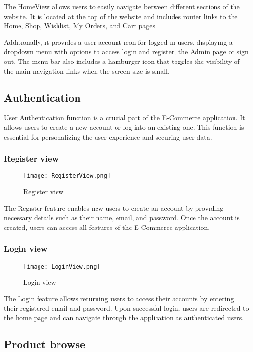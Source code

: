The HomeView allows users to easily navigate between different sections of the website. It is located at the top of the website and includes router links to the Home, Shop, Wishlist, My Orders, and Cart pages.

Additionally, it provides a user account icon for logged-in users, displaying a dropdown menu with options to access login and register, the Admin page or sign out. The menu bar also includes a hamburger icon that toggles the visibility of the main navigation links when the screen size is small.
\subsection{Authentication}
User Authentication function is a crucial part of the E-Commerce application. It allows users to create a new account or log into an existing one. This function is essential for personalizing the user experience and securing user data.

\subsubsection{Register view}
\begin{figure}[H]
    \texttt{[image: RegisterView.png]}
    \caption{Register view}
    \label{fig:RegisterView}
\end{figure}

The Register feature enables new users to create an account by providing necessary details such as their name, email, and password. Once the account is created, users can access all features of the E-Commerce application.

\subsubsection{Login view}
\begin{figure}[H]
    \texttt{[image: LoginView.png]}
    \caption{Login view}
    \label{fig:LoginView}
\end{figure}

The Login feature allows returning users to access their accounts by entering their registered email and password. Upon successful login, users are redirected to the home page and can navigate through the application as authenticated users.

\subsection{Product browse}
